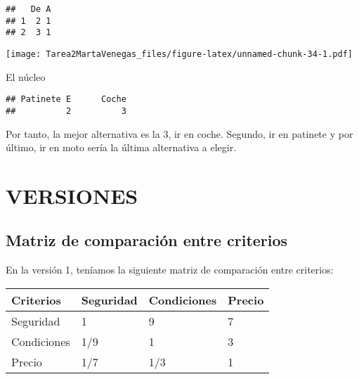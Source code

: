 \documentclass[
]{article}
\newenvironment{Shaded}{\begin{snugshade}}{\end{snugshade}}
\newcommand{\FunctionTok}[1]{\textcolor[rgb]{0.00,0.00,0.00}{#1}}
\newcommand{\NormalTok}[1]{#1}
\newcommand{\SpecialCharTok}[1]{\textcolor[rgb]{0.00,0.00,0.00}{#1}}
\begin{document}
\begin{verbatim}
##   De A
## 1  2 1
## 2  3 1
\end{verbatim}

\begin{Shaded}
\end{Shaded}

\texttt{[image: Tarea2MartaVenegas\_files/figure-latex/unnamed-chunk-34-1.pdf]}

El núcleo

\begin{Shaded}
\end{Shaded}

\begin{verbatim}
## Patinete E      Coche 
##          2          3
\end{verbatim}

Por tanto, la mejor alternativa es la 3, ir en coche. Segundo, ir en
patinete y por último, ir en moto sería la última alternativa a elegir.

\hypertarget{versiones}{%
\section{VERSIONES}\label{versiones}}

\hypertarget{matriz-de-comparaciuxf3n-entre-criterios}{%
\subsection{Matriz de comparación entre
criterios}\label{matriz-de-comparaciuxf3n-entre-criterios}}

En la versión 1, teníamos la siguiente matriz de comparación entre
criterios:

\begin{longtable}[]{@{}llll@{}}
\toprule
Criterios & Seguridad & Condiciones & Precio \\
\midrule
\endhead
Seguridad & 1 & 9 & 7 \\
Condiciones & 1/9 & 1 & 3 \\
Precio & 1/7 & 1/3 & 1 \\
\bottomrule
\end{longtable}
\end{document}
